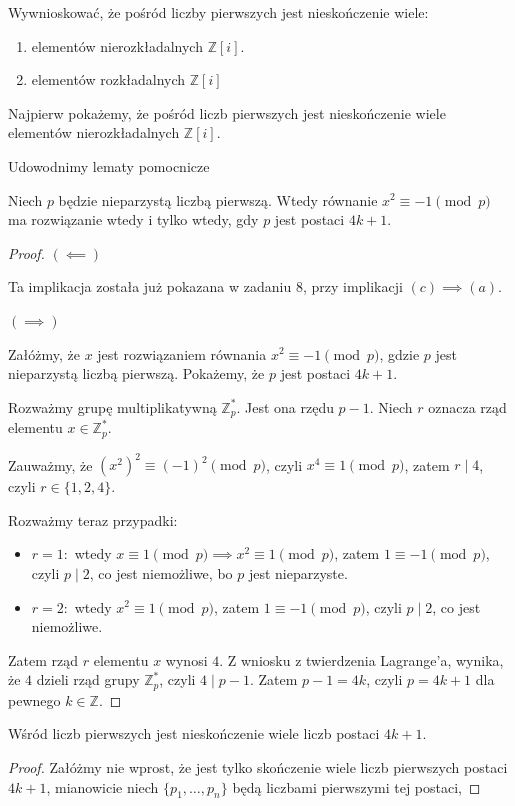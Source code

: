 \begin{problem}[9]
	Wywnioskować, że pośród liczby pierwszych jest nieskończenie wiele:
	\begin{enumerate}[label=(\alph*)]
		\item elementów nierozkładalnych $\mathbb{Z}\left[i\right]$.
		\item elementów rozkładalnych $\mathbb{Z}\left[i\right]$
	\end{enumerate}
\end{problem} 
\begin{solution}
	Najpierw pokażemy, że pośród liczb pierwszych jest nieskończenie wiele elementów nierozkładalnych $\mathbb{Z}\left[ i \right]$.

	Udowodnimy lematy pomocnicze
	\begin{lemma}[1]
		Niech $p$ będzie nieparzystą liczbą pierwszą. Wtedy równanie $ x^2 \equiv -1 \pmod{p}$ ma rozwiązanie wtedy i tylko wtedy, gdy $p$ jest postaci $4k+1$.
	\end{lemma} 
	\begin{proof}
		\noindent $\bm{ \left( \impliedby \right)  } $
		
		Ta implikacja została już pokazana w zadaniu 8, przy implikacji $\left( c \right) \implies \left( a \right) $.

		\noindent $\bm{ \left( \implies \right)  } $

		Załóżmy, że $x$ jest rozwiązaniem równania $x^2 \equiv -1 \pmod{p}$, gdzie $p$ jest nieparzystą liczbą pierwszą. Pokażemy, że $p$ jest postaci $4k + 1$.

		Rozważmy grupę multiplikatywną $\mathbb{Z}_{p}^{\ast}$. Jest ona rzędu $p-1$. Niech  $r$ oznacza rząd elementu $x \in \mathbb{Z}_{p}^{\ast}$. 

		Zauważmy, że $\left( x^2 \right)^2 \equiv \left( -1 \right)^2 \pmod{p}$, czyli $x^{4} \equiv 1 \pmod{p}$, zatem $r \mid 4$, czyli $r\in \{1,2,4\}$.

		Rozważmy teraz przypadki:
		\begin{itemize}
			\item $r = 1:$ wtedy  $x \equiv 1 \pmod{p} \implies x^2 \equiv 1 \pmod{p}$, zatem $1 \equiv -1 \pmod{p}$, czyli $p \mid 2$, co jest niemożliwe, bo $p$ jest nieparzyste.
			\item $r = 2: $ wtedy  $x^2 \equiv 1 \pmod{p} $, zatem $1 \equiv -1 \pmod{p} $, czyli $p\mid 2$, co jest niemożliwe.
		\end{itemize}

		Zatem rząd $r$ elementu $x$ wynosi $4$. Z wniosku z twierdzenia Lagrange'a, wynika, że $4$ dzieli rząd grupy $\mathbb{Z}_{p}^{\ast}$, czyli $4 \mid p-1$. Zatem  $p-1 = 4k$, czyli  $p = 4k + 1$ dla pewnego $k \in \mathbb{Z}$.
	\end{proof} 
	\begin{lemma}[2]
		Wśród liczb pierwszych jest nieskończenie wiele liczb postaci $4k + 1$.
	\end{lemma} 
	\begin{proof}
		Załóżmy nie wprost, że jest tylko skończenie wiele liczb pierwszych postaci $4k + 1$, mianowicie niech  $\{p_1,\ldots,p_{n}\}$ będą liczbami pierwszymi tej postaci,


\end{proof}
\end{solution}
